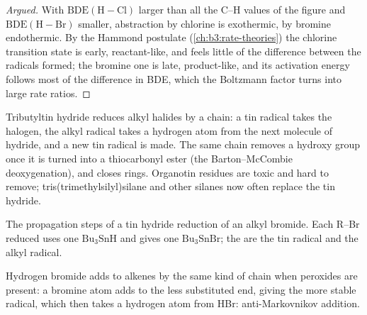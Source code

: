 \begin{proof}[Argued]
With $\mathrm{BDE(H{-}Cl)}$ larger than all the C--H values of the figure and $\mathrm{BDE(H{-}Br)}$ smaller,
abstraction by chlorine is exothermic, by bromine endothermic. By the Hammond
postulate (\cref{ch:b3:rate-theories}) the chlorine transition state is early,
reactant-like, and feels little of the difference between the radicals formed;
the bromine one is late, product-like, and its activation energy follows most of
the difference in BDE, which the Boltzmann factor turns into large rate ratios.
\end{proof}

Tributyltin hydride reduces alkyl halides by a chain: a tin radical takes the
halogen, the alkyl radical takes a hydrogen atom from the next molecule of
hydride, and a new tin radical is made. The same chain removes a hydroxy group
once it is turned into a thiocarbonyl ester (the Barton--McCombie
deoxygenation), and closes rings. Organotin residues are toxic and hard to
remove; tris(trimethylsilyl)silane and other silanes now often replace the tin
hydride.

\begin{omfigure}

{\small The propagation steps of a tin hydride reduction of an alkyl bromide.
Each R--Br reduced uses one $\mathrm{Bu_3SnH}$ and gives one $\mathrm{Bu_3SnBr}$; the 
are the tin radical and the alkyl radical.}
\end{omfigure}

Hydrogen bromide adds to alkenes by the same kind of chain when peroxides are
present: a bromine atom adds to the less substituted end, giving the more
stable radical, which then takes a hydrogen atom from HBr: anti-Markovnikov
addition.

